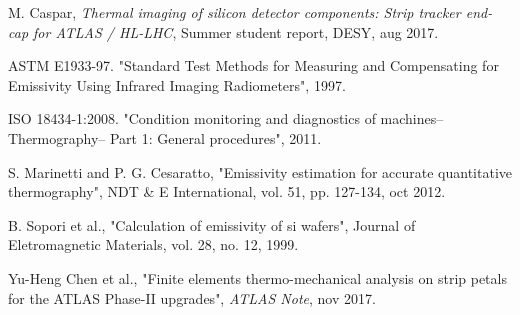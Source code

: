 \begin{enumerate}[label={[\arabic*]}]
		\item M. Caspar, \textit{Thermal imaging of silicon detector components: Strip tracker end-cap for	ATLAS / HL-LHC}, Summer student report, DESY, aug 2017.\label{ref10}
		
		\item ASTM E1933-97. "Standard Test Methods for Measuring and Compensating for Emissivity Using Infrared Imaging Radiometers", 1997.\label{ref11}
		
		\item ISO 18434-1:2008. "Condition monitoring and diagnostics of machines–Thermography– Part 1: General procedures", 2011.\label{ref12}
		
		\item S. Marinetti and P. G. Cesaratto, "Emissivity estimation for accurate quantitative thermography", NDT \& E International, vol. 51, pp. 127-134, oct 2012.\label{ref13}
		
		\item B. Sopori et al., "Calculation of emissivity of si wafers", Journal of Eletromagnetic Materials, vol. 28, no. 12, 1999.\label{ref14}
		
		\item Yu-Heng Chen et al., "Finite elements thermo-mechanical analysis on strip petals for the ATLAS Phase-II upgrades", \textit{ATLAS Note}, nov 2017.\label{ref15}
	\end{enumerate}